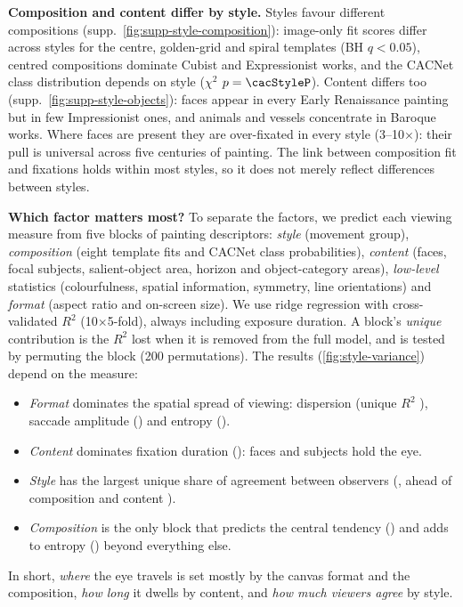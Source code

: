 \documentclass[10pt,twocolumn,letterpaper]{article}
\newcommand{\mypara}[1]{\vspace{2pt}\noindent\textbf{#1}\hspace{0.5em}}
\begin{document}
\mypara{Composition and content differ by style.} Styles favour different compositions
(supp.\ \cref{fig:supp-style-composition}): image-only fit scores differ across styles for the centre, golden-grid and
spiral templates (BH $q<0.05$), centred compositions dominate Cubist and Expressionist works, and the CACNet class
distribution depends on style ($\chi^2$ $p=\cacStyleP$). Content differs too (supp.\ \cref{fig:supp-style-objects}):
faces appear in every Early Renaissance painting but in few Impressionist ones, and animals and vessels concentrate in
Baroque works. Where faces are present they are over-fixated in every style (3--10$\times$): their pull is
universal across five centuries of painting. The link between composition fit and fixations holds within most styles,
so it does not merely reflect differences between styles.

\mypara{Which factor matters most?} To separate the factors, we predict each viewing measure from five blocks of
painting descriptors: \emph{style} (movement group), \emph{composition} (eight template fits and CACNet class
probabilities), \emph{content} (faces, focal subjects, salient-object area, horizon and object-category areas),
\emph{low-level} statistics (colourfulness, spatial information, symmetry, line orientations) and \emph{format} (aspect
ratio and on-screen size). We use ridge regression with cross-validated $R^2$ (10$\times$5-fold), always including
exposure duration. A block's \emph{unique} contribution is the $R^2$ lost when it is removed from the full model, and
is tested by permuting the block (200 permutations). The results (\cref{fig:style-variance}) depend on the measure:
\begin{itemize}
  \item \emph{Format} dominates the spatial spread of viewing: dispersion (unique $R^2$ \uFmtDisp), saccade amplitude
  (\uFmtAmp) and entropy (\uFmtEnt).
  \item \emph{Content} dominates fixation duration (\uContDur): faces and subjects hold the eye.
  \item \emph{Style} has the largest unique share of agreement between observers (\uStyAgr, ahead of composition
  \uCompAgr{} and content \uContAgr).
  \item \emph{Composition} is the only block that predicts the central tendency (\uCompCen) and adds to entropy
  (\uCompEnt) beyond everything else.
\end{itemize}
In short, \emph{where} the eye travels is set mostly
by the canvas format and the composition, \emph{how long} it dwells by content, and \emph{how much viewers agree} by
style.
\end{document}
